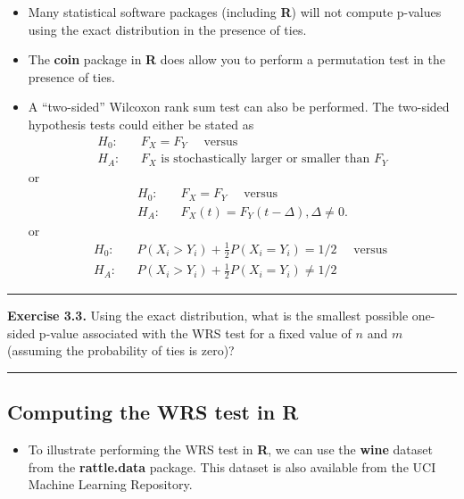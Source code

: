 \documentclass[]{book}
\providecommand{\tightlist}{%
  \setlength{\itemsep}{0pt}\setlength{\parskip}{0pt}}
\begin{document}
\begin{itemize}
\item
  Many statistical software packages (including \textbf{R}) will not compute p-values using the exact distribution in
  the presence of ties.
\item
  The \textbf{coin} package in \textbf{R} does allow you to perform a permutation test in the presence of ties.
\item
  A ``two-sided'' Wilcoxon rank sum test can also be performed. The two-sided
  hypothesis tests could either be stated as
  \begin{eqnarray}
  H_{0}: & & F_{X} = F_{Y} \quad \textrm{ versus } \nonumber \\
  H_{A}: & & F_{X} \textrm{ is stochastically larger or smaller than } F_{Y} 
  \end{eqnarray}
  or
  \begin{eqnarray}
  H_{0}: & & F_{X} = F_{Y} \quad \textrm{ versus } \nonumber \\
  H_{A}: & & F_{X}(t) = F_{Y}(t - \Delta), \Delta \neq 0.
  \end{eqnarray}
  or
  \begin{eqnarray}
  H_{0}: && P(X_{i} > Y_{i}) + \tfrac{1}{2}P(X_{i} = Y_{i}) = 1/2 \quad \textrm{ versus } \\
  H_{A}: && P(X_{i} > Y_{i}) + \tfrac{1}{2}P(X_{i} = Y_{i}) \neq 1/2
  \end{eqnarray}
\end{itemize}

\begin{center}\rule{0.5\linewidth}{\linethickness}\end{center}

\textbf{Exercise 3.3.} Using the exact distribution, what is the smallest
possible one-sided p-value associated with the WRS test
for a fixed value of \(n\) and \(m\) (assuming the probability of ties is zero)?

\begin{center}\rule{0.5\linewidth}{\linethickness}\end{center}

\hypertarget{computing-the-wrs-test-in-r}{%
\subsection{Computing the WRS test in R}\label{computing-the-wrs-test-in-r}}

\begin{itemize}
\tightlist
\item
  To illustrate performing the WRS test in \textbf{R}, we can use the \textbf{wine} dataset from the \textbf{rattle.data} package.
  This dataset is also available from the UCI Machine Learning Repository.
\end{itemize}
\end{document}
